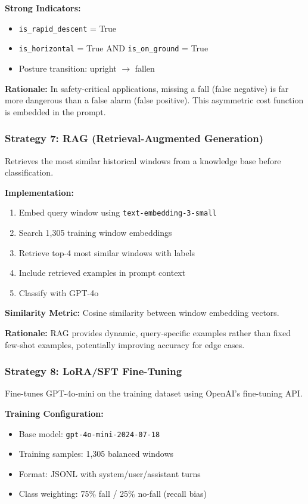 \documentclass[conference]{IEEEtran}
\begin{document}
\textbf{Strong Indicators:}
\begin{itemize}[leftmargin=*]
    \item \texttt{is\_rapid\_descent} = True
    \item \texttt{is\_horizontal} = True AND \texttt{is\_on\_ground} = True
    \item Posture transition: upright $\rightarrow$ fallen
\end{itemize}

\textbf{Rationale:} In safety-critical applications, missing a fall (false negative) is far more dangerous than a false alarm (false positive). This asymmetric cost function is embedded in the prompt.

\subsubsection{Strategy 7: RAG (Retrieval-Augmented Generation)}
Retrieves the most similar historical windows from a knowledge base before classification.

\textbf{Implementation:}
\begin{enumerate}
    \item Embed query window using \texttt{text-embedding-3-small}
    \item Search 1,305 training window embeddings
    \item Retrieve top-4 most similar windows with labels
    \item Include retrieved examples in prompt context
    \item Classify with GPT-4o
\end{enumerate}

\textbf{Similarity Metric:} Cosine similarity between window embedding vectors.

\textbf{Rationale:} RAG provides dynamic, query-specific examples rather than fixed few-shot examples, potentially improving accuracy for edge cases.

\subsubsection{Strategy 8: LoRA/SFT Fine-Tuning}
Fine-tunes GPT-4o-mini on the training dataset using OpenAI's fine-tuning API.

\textbf{Training Configuration:}
\begin{itemize}[leftmargin=*]
    \item Base model: \texttt{gpt-4o-mini-2024-07-18}
    \item Training samples: 1,305 balanced windows
    \item Format: JSONL with system/user/assistant turns
    \item Class weighting: 75\% fall / 25\% no-fall (recall bias)
\end{itemize}
\end{document}
